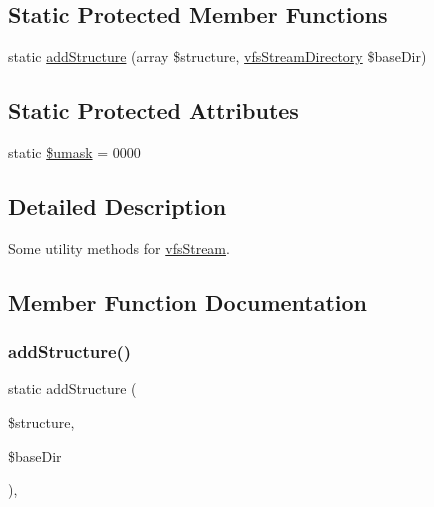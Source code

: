 \subsection*{Static Protected Member Functions}
\begin{DoxyCompactItemize}
\item 
static \mbox{\hyperlink{classorg_1_1bovigo_1_1vfs_1_1vfs_stream_a519af95cdacbaf22c974c88175d4f6f7}{add\+Structure}} (array \$structure, \mbox{\hyperlink{classorg_1_1bovigo_1_1vfs_1_1vfs_stream_directory}{vfs\+Stream\+Directory}} \$base\+Dir)
\end{DoxyCompactItemize}
\subsection*{Static Protected Attributes}
\begin{DoxyCompactItemize}
\item 
static \mbox{\hyperlink{classorg_1_1bovigo_1_1vfs_1_1vfs_stream_a4c000b60583eda8e4aaaf00a28aec3d1}{\$umask}} = 0000
\end{DoxyCompactItemize}


\subsection{Detailed Description}
Some utility methods for \mbox{\hyperlink{classorg_1_1bovigo_1_1vfs_1_1vfs_stream}{vfs\+Stream}}.

\subsection{Member Function Documentation}
\mbox{\label{classorg_1_1bovigo_1_1vfs_1_1vfs_stream_a519af95cdacbaf22c974c88175d4f6f7}} 
\subsubsection{\texorpdfstring{add\+Structure()}{addStructure()}}
{\footnotesize\ttfamily static add\+Structure (\begin{DoxyParamCaption}\item[{array}]{\$structure,  }\item[{\mbox{\hyperlink{classorg_1_1bovigo_1_1vfs_1_1vfs_stream_directory}{vfs\+Stream\+Directory}}}]{\$base\+Dir }\end{DoxyParamCaption})\hspace{0.3cm}{\ttfamily [static]}, {\ttfamily [protected]}}

